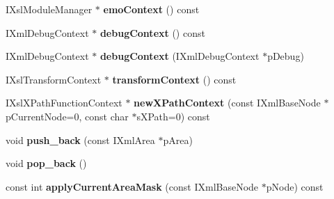 \begin{DoxyCompactItemize}
\item 
\hypertarget{classgeneral__server_1_1DatabaseAdminQueryEnvironment_a0a50d3f5422e26c9ab930ca7c951a136}{\-I\-Xsl\-Module\-Manager $\ast$ {\bfseries emo\-Context} () const }\label{classgeneral__server_1_1DatabaseAdminQueryEnvironment_a0a50d3f5422e26c9ab930ca7c951a136}

\item 
\hypertarget{classgeneral__server_1_1DatabaseAdminQueryEnvironment_afab37e68bfe20e209eb210204bfe888d}{\-I\-Xml\-Debug\-Context $\ast$ {\bfseries debug\-Context} () const }\label{classgeneral__server_1_1DatabaseAdminQueryEnvironment_afab37e68bfe20e209eb210204bfe888d}

\item 
\hypertarget{classgeneral__server_1_1DatabaseAdminQueryEnvironment_aff0467a7af686134d0cc373a6b4eada3}{\-I\-Xml\-Debug\-Context $\ast$ {\bfseries debug\-Context} (\-I\-Xml\-Debug\-Context $\ast$p\-Debug)}\label{classgeneral__server_1_1DatabaseAdminQueryEnvironment_aff0467a7af686134d0cc373a6b4eada3}

\item 
\hypertarget{classgeneral__server_1_1DatabaseAdminQueryEnvironment_adce004d8cae038f4d7e24ae675d00f63}{\-I\-Xsl\-Transform\-Context $\ast$ {\bfseries transform\-Context} () const }\label{classgeneral__server_1_1DatabaseAdminQueryEnvironment_adce004d8cae038f4d7e24ae675d00f63}

\item 
\hypertarget{classgeneral__server_1_1DatabaseAdminQueryEnvironment_a34d23f23449e9652e2514250d96d4bce}{\-I\-Xsl\-X\-Path\-Function\-Context $\ast$ {\bfseries new\-X\-Path\-Context} (const \-I\-Xml\-Base\-Node $\ast$p\-Current\-Node=0, const char $\ast$s\-X\-Path=0) const }\label{classgeneral__server_1_1DatabaseAdminQueryEnvironment_a34d23f23449e9652e2514250d96d4bce}

\item 
\hypertarget{classgeneral__server_1_1DatabaseAdminQueryEnvironment_a2e7f3b2acd95c128b8a523320ea09a77}{void {\bfseries push\-\_\-back} (const \-I\-Xml\-Area $\ast$p\-Area)}\label{classgeneral__server_1_1DatabaseAdminQueryEnvironment_a2e7f3b2acd95c128b8a523320ea09a77}

\item 
\hypertarget{classgeneral__server_1_1DatabaseAdminQueryEnvironment_a4139de70bc824cf50bbbd113864f2e85}{void {\bfseries pop\-\_\-back} ()}\label{classgeneral__server_1_1DatabaseAdminQueryEnvironment_a4139de70bc824cf50bbbd113864f2e85}

\item 
\hypertarget{classgeneral__server_1_1DatabaseAdminQueryEnvironment_a4d35456e0d1362298926636b09c8fa76}{const int {\bfseries apply\-Current\-Area\-Mask} (const \-I\-Xml\-Base\-Node $\ast$p\-Node) const }\label{classgeneral__server_1_1DatabaseAdminQueryEnvironment_a4d35456e0d1362298926636b09c8fa76}


\end{DoxyCompactItemize}
